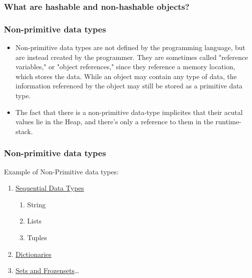 \documentclass{beamer}
\begin{document}
\begin{frame}[fragile]
\frametitle{What are hashable and non-hashable objects?}

\end{frame}

\begin{frame}[fragile]
\frametitle{Non-primitive data types}
\begin{itemize}
	\item Non-primitive data types are not defined by the programming language, but are instead created by the programmer. They are sometimes called "reference variables," or "object references," since they reference a memory location, which stores the data. 
While an object may contain any type of data, 
the information referenced by the object may still be stored as a primitive data type.
	\item The fact that there is a non-primitive data-type implicites that their acutal values lie in the Heap, and there's only a reference to them in the runtime-stack. 
\end{itemize}
\end{frame}


\begin{frame}[fragile]
\frametitle{Non-primitive data types}
Example of Non-Primitive data types:
\begin{enumerate}
	\item \href{http://www.python-course.eu/sequential_data_types.php}{Sequential Data Types}
	  \begin{enumerate}
	    \item String
	    \item Lists
	    \item Tuples
	  \end{enumerate}
	\item \href{http://www.python-course.eu/dictionaries.php}{Dictionaries}
	\item \href{http://www.python-course.eu/sets_frozensets.php}{Sets and Frozensets}\ldots

\end{enumerate}

\end{frame}

	
\end{document}
